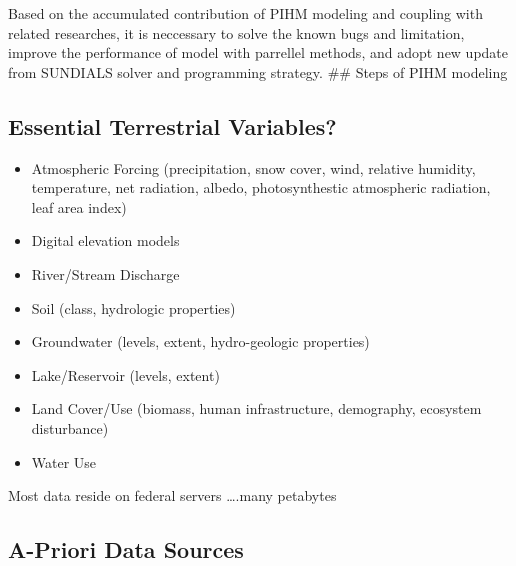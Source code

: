 \documentclass[]{scrbook}
\providecommand{\tightlist}{%
  \setlength{\itemsep}{0pt}\setlength{\parskip}{0pt}}
\begin{document}
Based on the accumulated contribution of PIHM modeling and coupling with
related researches, it is neccessary to solve the known bugs and
limitation, improve the performance of model with parrellel methods, and
adopt new update from SUNDIALS solver and programming strategy. \#\#
Steps of PIHM modeling

\subsection{Essential Terrestrial
Variables?}\label{essential-terrestrial-variables}

\begin{itemize}
\tightlist
\item
  Atmospheric Forcing (precipitation, snow cover, wind, relative
  humidity, temperature, net radiation, albedo, photosynthestic
  atmospheric radiation, leaf area index)
\item
  Digital elevation models
\item
  River/Stream Discharge
\item
  Soil (class, hydrologic properties)
\item
  Groundwater (levels, extent, hydro-geologic properties)
\item
  Lake/Reservoir (levels, extent)
\item
  Land Cover/Use (biomass, human infrastructure, demography, ecosystem
  disturbance)
\item
  Water Use
\end{itemize}

Most data reside on federal servers \ldots{}.many petabytes

\subsection{A-Priori Data Sources}\label{a-priori-data-sources}
\end{document}
